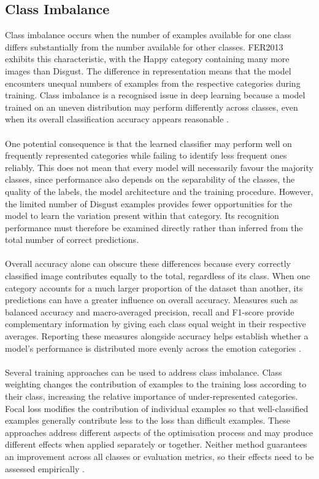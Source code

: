 \documentclass[12pt, a4paper]{report}
\let\oldsubsection\subsection
\renewcommand{\subsection}{%
    \Needspace{6\baselineskip}%
    \oldsubsection
}
\begin{document}
			\subsection{Class Imbalance}
				
				Class imbalance occurs when the number of examples available for one class differs substantially from the number available for other classes. FER2013 exhibits this characteristic, with the Happy category containing many more images than Disgust. The difference in representation means that the model encounters unequal numbers of examples from the respective categories during training. Class imbalance is a recognised issue in deep learning because a model trained on an uneven distribution may perform differently across classes, even when its overall classification accuracy appears reasonable \cite{Johnson2019ClassImbalance, Cui2019ClassBalanced}.\\\\
				One potential consequence is that the learned classifier may perform well on frequently represented categories while failing to identify less frequent ones reliably. This does not mean that every model will necessarily favour the majority classes, since performance also depends on the separability of the classes, the quality of the labels, the model architecture and the training procedure. However, the limited number of Disgust examples provides fewer opportunities for the model to learn the variation present within that category. Its recognition performance must therefore be examined directly rather than inferred from the total number of correct predictions.\\\\
				Overall accuracy alone can obscure these differences because every correctly classified image contributes equally to the total, regardless of its class. When one category accounts for a much larger proportion of the dataset than another, its predictions can have a greater influence on overall accuracy. Measures such as balanced accuracy and macro-averaged precision, recall and F1-score provide complementary information by giving each class equal weight in their respective averages. Reporting these measures alongside accuracy helps establish whether a model's performance is distributed more evenly across the emotion categories \cite{Johnson2019ClassImbalance, Farhadpour2024MetricsImbalance, Opitz2024ClassificationMetrics}.\\\\
				Several training approaches can be used to address class imbalance. Class weighting changes the contribution of examples to the training loss according to their class, increasing the relative importance of under-represented categories. Focal loss modifies the contribution of individual examples so that well-classified examples generally contribute less to the loss than difficult examples. These approaches address different aspects of the optimisation process and may produce different effects when applied separately or together. Neither method guarantees an improvement across all classes or evaluation metrics, so their effects need to be assessed empirically \cite{lin2017focal, Cui2019ClassBalanced, Johnson2019ClassImbalance}.\\\\
\end{document}
